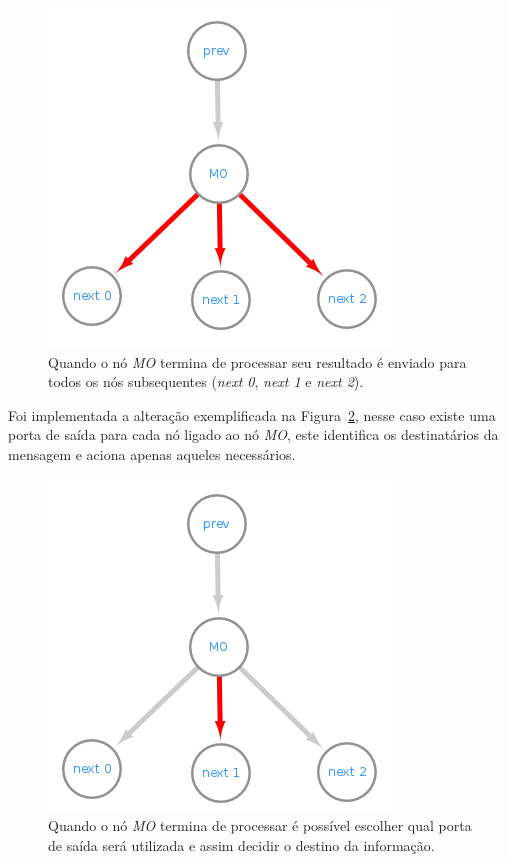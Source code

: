 \begin{figure}[htbp]
    \centerline{\includegraphics[scale=0.9]{figuras/dataflow/multi_output3.png}}
    \caption{Quando o nó \textit{MO} termina de processar seu resultado é enviado para todos os nós subsequentes (\textit{next 0}, \textit{next 1} e \textit{next 2}).}
    \label{fig:dataflowMo3}
\end{figure}

Foi implementada a alteração exemplificada na Figura~\ref{fig:dataflowMo1}, nesse caso existe uma porta de saída para cada nó ligado ao nó \textit{MO}, este identifica os destinatários da mensagem e aciona apenas aqueles necessários.

\begin{figure}[htbp]
    \centerline{\includegraphics[scale=0.9]{figuras/dataflow/multi_output1.png}}
    \caption{Quando o nó \textit{MO} termina de processar é possível escolher qual porta de saída será utilizada e assim decidir o destino da informação.}
    \label{fig:dataflowMo1}
\end{figure}

